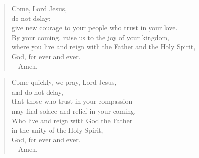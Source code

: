 \prayer

\setlength{\vleftmargin}{\prayerleftmargini}

\begin{verse}
Come, Lord Jesus,\\
do not delay;\\
give new courage to your people who trust in your love.\\
By your coming, raise us to the joy of your kingdom,\\
where you live and reign with the Father and the Holy Spirit,\\
God, for ever and ever.\\
{\color{red}---\thinspace}Amen.
\end{verse}


\begin{verse}
Come quickly, we pray, Lord Jesus,\\
and do not delay,\\
that those who trust in your compassion\\
may find solace and relief in your coming.\\
Who live and reign with God the Father\\
in the unity of the Holy Spirit,\\
God, for ever and ever.\\
{\color{red}---\thinspace}Amen.

\end{verse}

\setlength{\vleftmargin}{\defleftmargini}